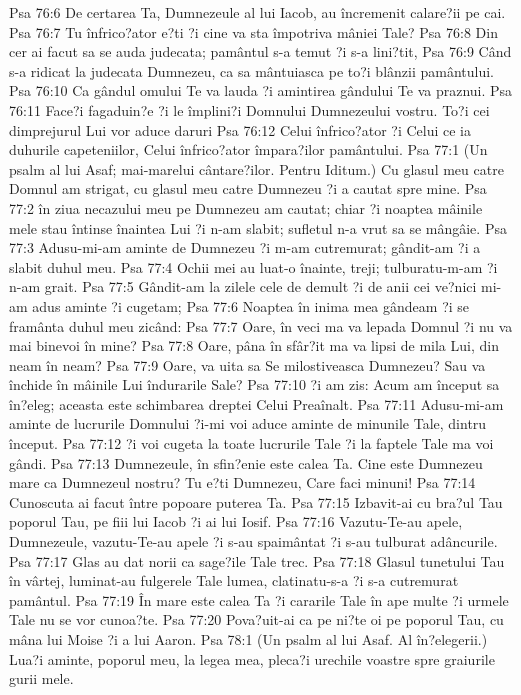Psa 76:6  De certarea Ta, Dumnezeule al lui Iacob, au încremenit calare?ii pe cai.
Psa 76:7  Tu înfrico?ator e?ti ?i cine va sta împotriva mâniei Tale?
Psa 76:8  Din cer ai facut sa se auda judecata; pamântul s-a temut ?i s-a lini?tit,
Psa 76:9  Când s-a ridicat la judecata Dumnezeu, ca sa mântuiasca pe to?i blânzii pamântului.
Psa 76:10  Ca gândul omului Te va lauda ?i amintirea gândului Te va praznui.
Psa 76:11  Face?i fagaduin?e ?i le împlini?i Domnului Dumnezeului vostru. To?i cei dimprejurul Lui vor aduce daruri
Psa 76:12  Celui înfrico?ator ?i Celui ce ia duhurile capeteniilor, Celui înfrico?ator împara?ilor pamântului.
Psa 77:1  (Un psalm al lui Asaf; mai-marelui cântare?ilor. Pentru Iditum.) Cu glasul meu catre Domnul am strigat, cu glasul meu catre Dumnezeu ?i a cautat spre mine.
Psa 77:2  în ziua necazului meu pe Dumnezeu am cautat; chiar ?i noaptea mâinile mele stau întinse înaintea Lui ?i n-am slabit; sufletul n-a vrut sa se mângâie.
Psa 77:3  Adusu-mi-am aminte de Dumnezeu ?i m-am cutremurat; gândit-am ?i a slabit duhul meu.
Psa 77:4  Ochii mei au luat-o înainte, treji; tulburatu-m-am ?i n-am grait.
Psa 77:5  Gândit-am la zilele cele de demult ?i de anii cei ve?nici mi-am adus aminte ?i cugetam;
Psa 77:6  Noaptea în inima mea gândeam ?i se framânta duhul meu zicând:
Psa 77:7  Oare, în veci ma va lepada Domnul ?i nu va mai binevoi în mine?
Psa 77:8  Oare, pâna în sfâr?it ma va lipsi de mila Lui, din neam în neam?
Psa 77:9  Oare, va uita sa Se milostiveasca Dumnezeu? Sau va închide în mâinile Lui îndurarile Sale?
Psa 77:10  ?i am zis: Acum am început sa în?eleg; aceasta este schimbarea dreptei Celui Preaînalt.
Psa 77:11  Adusu-mi-am aminte de lucrurile Domnului ?i-mi voi aduce aminte de minunile Tale, dintru început.
Psa 77:12  ?i voi cugeta la toate lucrurile Tale ?i la faptele Tale ma voi gândi.
Psa 77:13  Dumnezeule, în sfin?enie este calea Ta. Cine este Dumnezeu mare ca Dumnezeul nostru? Tu e?ti Dumnezeu, Care faci minuni!
Psa 77:14  Cunoscuta ai facut între popoare puterea Ta.
Psa 77:15  Izbavit-ai cu bra?ul Tau poporul Tau, pe fiii lui Iacob ?i ai lui Iosif.
Psa 77:16  Vazutu-Te-au apele, Dumnezeule, vazutu-Te-au apele ?i s-au spaimântat ?i s-au tulburat adâncurile.
Psa 77:17  Glas au dat norii ca sage?ile Tale trec.
Psa 77:18  Glasul tunetului Tau în vârtej, luminat-au fulgerele Tale lumea, clatinatu-s-a ?i s-a cutremurat pamântul.
Psa 77:19  În mare este calea Ta ?i cararile Tale în ape multe ?i urmele Tale nu se vor cunoa?te.
Psa 77:20  Pova?uit-ai ca pe ni?te oi pe poporul Tau, cu mâna lui Moise ?i a lui Aaron.
Psa 78:1  (Un psalm al lui Asaf. Al în?elegerii.) Lua?i aminte, poporul meu, la legea mea, pleca?i urechile voastre spre graiurile gurii mele.
